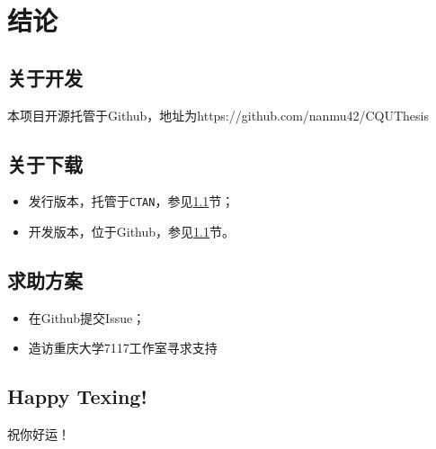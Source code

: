 \chapter{结论}
\section{关于开发}\label{sec:dev}
本项目开源托管于Github，地址为https://github.com/nanmu42/CQUThesis
\section{关于下载}
\begin{itemize}
	\item 发行版本，托管于\texttt{CTAN}，参见\ref{sec:dev}节；
	\item 开发版本，位于Github，参见\ref{sec:dev}节。
\end{itemize}
\section{求助方案}
\begin{itemize}
	\item 在Github提交Issue；
	\item 造访重庆大学7117工作室寻求支持
\end{itemize}
\section{Happy Texing!}
祝你好运！